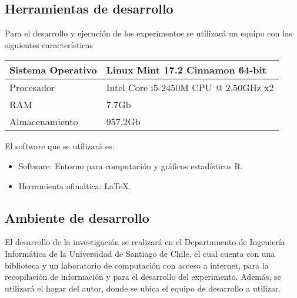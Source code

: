 \subsection{Herramientas de desarrollo}
Para el desarrollo y ejecución de los experimentos se utilizará un equipo con las siguientes características
\begin{table}[H]
    \centering
    \begin{tabular}{|l|l|}\hline
        Sistema Operativo   & Linux Mint 17.2 Cinnamon 64-bit\\\hline
        Procesador          & Intel Core i5-2450M CPU @ 2.50GHz x2\\\hline
        RAM                 & 7.7Gb\\\hline
        Almacenamiento      & 957.2Gb\\\hline
    \end{tabular}
\end{table}

El software que se utilizará es:
\begin{itemize}
    \item Software: Entorno para computación y gráficos estadísticos R.
    \item Herramienta ofimática: \LaTeX.
\end{itemize}

\subsection{Ambiente de desarrollo}
El desarrollo de la investigación se realizará en el Departamento de Ingeniería Informática de la Universidad de Santiago de Chile, el cual cuenta con una biblioteca y un laboratorio de computación con acceso a internet, para la recopilación de información y para el desarrollo del experimento. Además, se utilizará el hogar del autor, donde se ubica el equipo de desarrollo a utilizar.
